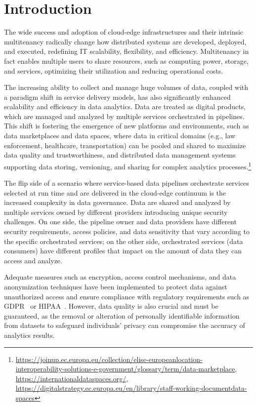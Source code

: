 \section{Introduction}
{\color{OurColor}The wide success and adoption of cloud-edge infrastructures and their intrinsic multitenancy radically change how distributed systems are developed, deployed, and executed, redefining IT scalability, flexibility, and efficiency.} Multitenancy in fact enables multiple users to share resources, such as computing power, storage, and services, optimizing their utilization and reducing operational costs.

{\color{OurColor}The increasing ability to collect and manage huge volumes of data, coupled with a paradigm shift in service delivery models, has also significantly enhanced scalability and efficiency in data analytics. Data are treated as digital products, which are managed and analyzed by multiple services orchestrated in pipelines. This shift is fostering the emergence of new platforms and environments, such as data marketplaces and data spaces, where data in critical domains (e.g., law enforcement, healthcare, transportation) can be pooled and shared to maximize data quality and trustworthiness,
and distributed data management systems supporting data storing, versioning, and sharing for complex analytics processes.}\footnote{\url{https://joinup.ec.europa.eu/collection/elise-europeanlocation-
interoperability-solutions-e-government/glossary/term/data-marketplace}, \url{https://internationaldataspaces.org/}, \url{https://digitalstrategy.ec.europa.eu/en/library/staff-working-documentdata-spaces}}

The flip side of a scenario {\color{OurColor}where service-based data pipelines orchestrate services selected at run time and are delivered in the cloud-edge continuum} is the increased complexity in data governance. {\color{OurColor}Data are shared and analyzed by multiple services owned by different providers introducing unique security challenges. On one side, the pipeline owner and data providers have different security requirements, access policies, and data sensitivity that vary according to the specific orchestrated services; on the other side, orchestrated services (data consumers) have different profiles that impact on the amount of data they can access and analyze.}

Adequate measures such as encryption, access control mechanisms, and data anonymization techniques have been implemented to protect data against unauthorized access and ensure compliance with regulatory requirements such as GDPR~\cite{EuropeanParliament2016a} or HIPAA~\cite{hipaa1996}. {\color{OurColor}However, data quality is also crucial and must be guaranteed, as the removal or alteration of personally identifiable information from datasets to safeguard individuals' privacy can compromise the accuracy of analytics results.}

